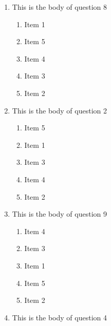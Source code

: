 \documentclass[amsfonts,bezier,leqno,fleqn,12pt,a4paper]{article}
\begin{document}
{{\begin{large}
\begin{enumerate}
\begin{enumerate}
\item  Item 5
\item  Item 2
\item  Item 3
\item  Item 4
\item  Item 1

\end{enumerate}
\newpage


\item This is the body of question 8
\vspace {0.3in}
\setcounter{equation}{0}

\begin{enumerate}
\item  Item 1
\item  Item 5
\item  Item 4
\item  Item 3
\item  Item 2

\end{enumerate}

\vspace {3.5cm}


\item This is the body of question 2
\vspace {0.3in}
\setcounter{equation}{0}

\begin{enumerate}
\item  Item 5
\item  Item 1
\item  Item 3
\item  Item 4
\item  Item 2

\end{enumerate}
\newpage


\item This is the body of question 9
\vspace {0.3in}
\setcounter{equation}{0}

\begin{enumerate}
\item  Item 4
\item  Item 3
\item  Item 1
\item  Item 5
\item  Item 2

\end{enumerate}

\vspace {3.5cm}


\item This is the body of question 4
\vspace {0.3in}
\setcounter{equation}{0}


\end{enumerate}
\end{large}}}
\end{document}
